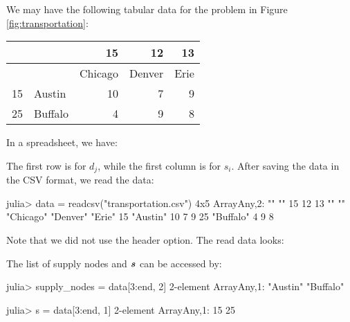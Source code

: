 We may have the following tabular data for the problem in Figure \ref{fig:transportation}:
\begin{center}
\newcommand{\nb}[1]{#1}
\newcommand{\nl}[1]{#1}
\begin{tabular}{|r|l|r|r|r|}
\hline
\nb{}	& 	\nb{}	&	\nb{15} &  \nb{12} &  \nb{13} \\
\hline
\nb{}	& 			&	Chicago	&	Denver &	Erie \\
\hline
\nl{15}	& Austin	&		 10 &        7 &       9 \\
\nl{25}	& Buffalo 	&         4 &        9 &       8 \\
\hline
\end{tabular}
\end{center}
In a spreadsheet, we have:
\begin{center}
\end{center}
The first row is for $d_j$, while the first column is for $s_i$. After saving the data in the CSV format, we read the data:
\begin{code}
julia> data = readcsv("transportation.csv")
4x5 Array{Any,2}:
   ""  ""         15           12          13
   ""  ""           "Chicago"    "Denver"    "Erie"
 15    "Austin"   10            7           9
 25    "Buffalo"   4            9           8
\end{code}


Note that we did not use the header option. The read data looks:

The list of supply nodes and $\boldsymbol{s}$ can be accessed by:
\begin{code}
julia> supply_nodes = data[3:end, 2]
2-element Array{Any,1}:
 "Austin"
 "Buffalo"

julia> s = data[3:end, 1]
2-element Array{Any,1}:
 15
 25
\end{code}

